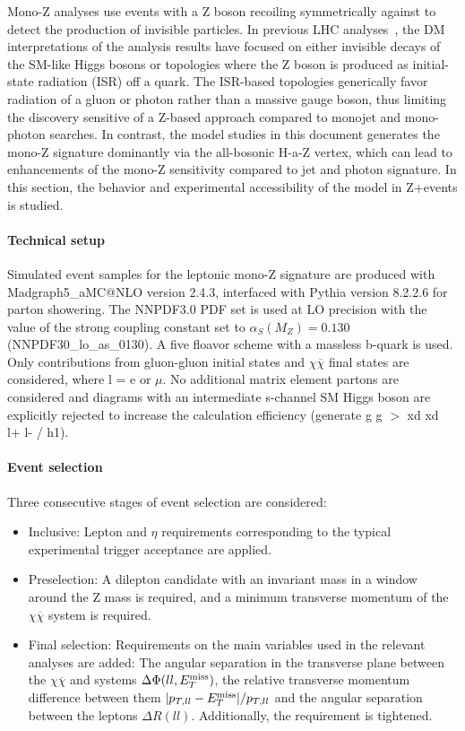 Mono-Z analyses use events with a Z boson recoiling symmetrically against \MET to detect the production of invisible particles.
In previous LHC analyses~\cite{Aaboud:2017bja,Sirunyan:2017qfc}, the DM interpretations of the analysis results have focused on either invisible decays of the SM-like Higgs bosons or topologies where the Z boson is produced as initial-state radiation (ISR) off a quark. The ISR-based topologies generically favor radiation of a gluon or photon rather than a massive gauge boson, thus limiting the discovery sensitive of a Z-based approach compared to monojet and mono-photon searches. In contrast, the model studies in this document generates the mono-Z signature dominantly via the all-bosonic H-a-Z vertex, which can lead to enhancements of the mono-Z sensitivity compared to jet and photon signature. In this section, the behavior and experimental accessibility of the model in Z+\MET events is studied.

\paragraph{Technical setup}
Simulated event samples for the leptonic mono-Z signature are produced with Madgraph5\_aMC@NLO version 2.4.3, interfaced with Pythia version 8.2.2.6 for parton showering. The NNPDF3.0 PDF set is used at LO precision with the value of the strong coupling constant set to $\alpha_{S}(M_{Z}) = 0.130$ (NNPDF30\_lo\_as\_0130). A five floavor scheme with a massless b-quark is used.  Only contributions from gluon-gluon initial states and \lp\lm$\chi\overline{\chi}$ final states are considered, where l = e or $\mu$. No additional matrix element partons are considered and diagrams with an intermediate s-channel SM Higgs boson are explicitly rejected to increase the calculation efficiency (generate g g $>$ xd xd~ l+ l- / h1). 


\paragraph{Event selection}
Three consecutive stages of event selection are considered:
\begin{itemize}
\item Inclusive: Lepton \pt and $\eta$ requirements corresponding to the typical experimental trigger acceptance are applied.

\item Preselection: A dilepton candidate with an invariant mass in a window around the Z mass is required, and a minimum transverse momentum of the $\chi\overline{\chi}$ system is required.

\item Final selection: Requirements on the main variables used in the relevant analyses are added: The angular separation in the transverse plane between the $\chi\overline{\chi}$ and \lp\lm systems $\Delta\Phi(ll,E_T^\mathrm{miss})$, the relative transverse momentum difference between them $|p_{T,ll} - E_T^\mathrm{miss}|/p_{T,ll}$ and the angular separation between the leptons $\Delta R(ll)$. Additionally, the \MET requirement is tightened.
\end{itemize}

